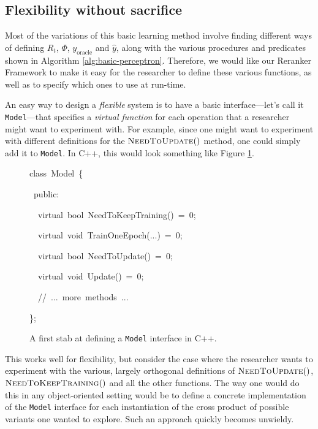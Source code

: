 \documentclass[a4paper]{article}
\newenvironment{lyxcode}
{\par\begin{list}{}{
\scriptsize
\setlength{\leftmargin}{0.1in}
\setlength{\rightmargin}{\leftmargin}
\setlength{\listparindent}{0pt}%
\raggedright
\setlength{\itemsep}{0pt}
\setlength{\parsep}{0pt}
\normalfont\ttfamily}%
 \item[]}
{\end{list}}
\begin{document}
\subsection{Flexibility without sacrifice}

Most of the variations of this basic learning method involve finding
different ways of defining $R_{t}$, $\Phi$, $y_{\mathrm{oracle}}$
and $\hat{y}$, along with the various procedures and predicates shown
in Algorithm \ref{alg:basic-perceptron}. Therefore, we would like
our Reranker Framework to make it easy for the researcher to define
these various functions, as well as to specify which ones to use at
run-time.

An easy way to design a \emph{flexible} system is to have a basic
interface---let's call it \texttt{Model}---that specifies a \emph{virtual
function} for each operation that a researcher might want to experiment
with. For example, since one might want to experiment with different
definitions for the $\Call{NeedToUpdate}{}()$ method, one could simply
add it to \texttt{Model}. In C++, this would look something like Figure
\ref{fig:model-interface}.

\begin{figure}
\begin{lyxcode}
class~Model~\{

~public:

~~virtual~bool~NeedToKeepTraining()~=~0;

~~virtual~void~TrainOneEpoch(...)~=~0;

~~virtual~bool~NeedToUpdate()~=~0;

~~virtual~void~Update()~=~0;

~~//~...~more~methods~...

\};
\end{lyxcode}
\caption{\label{fig:model-interface}A first stab at defining a \texttt{Model}
interface in C++.}
\end{figure}


This works well for flexibility, but consider the case where the researcher
wants to experiment with the various, largely orthogonal definitions
of $\Call{NeedToUpdate}{}()$, $\Call{NeedToKeepTraining}{}()$ and
all the other functions. The way one would do this in any object-oriented
setting would be to define a concrete implementation of the \texttt{Model}
interface for each instantiation of the cross product of possible
variants one wanted to explore. Such an approach quickly becomes unwieldy.
\end{document}
